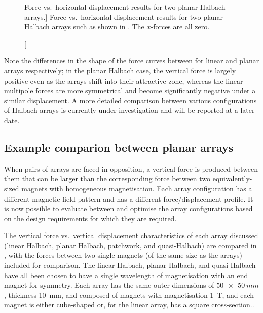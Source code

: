 \documentclass[11pt,a4paper]{memoir}
\begin{document}
\begin{figure}
\centering
{}
\caption
[Force vs.\ horizontal displacement results for two planar Halbach arrays.]
{Force vs.\ horizontal displacement results for two planar Halbach arrays such as shown in . The $x$-forces are all zero.}
\end{figure}

Note the differences in the shape of the force curves between  for linear and planar arrays respectively; in the planar Halbach case, the vertical force is largely positive even as the arrays shift into their attractive zone, whereas the linear multipole forces are more symmetrical and become significantly negative under a similar displacement.
A more detailed comparison between various configurations of Halbach arrays is currently under investigation and will be reported at a later date.

\subsection{Example comparion between planar arrays}

When pairs of arrays are faced in opposition, a vertical force is produced between them that can be larger than the corresponding force between two equivalently-sized magnets with homogeneous magnetisation.
Each array configuration has a different magnetic field pattern and has a different force/displacement profile.
It is now possible to evaluate between and optimise the array configurations based on the design requirements for which they are required.

The vertical force vs.\ vertical displacement characteristics of each array discussed (linear Halbach, planar Halbach, patchwork, and quasi-Halbach) are compared in , with the forces between two single magnets (of the same size as the arrays) included for comparison.
The linear Halbach, planar Halbach, and quasi-Halbach have all been chosen to have a single wavelength of magnetisation with an end magnet for symmetry.
Each array has the same outer dimensions of $\SI{50x50}{mm}$, thickness \SI{10}{mm}, and composed of magnets with magnetisation \SI{1}{T}, and each magnet is either cube-shaped or, for the linear array, has a square cross-section..
\end{document}
